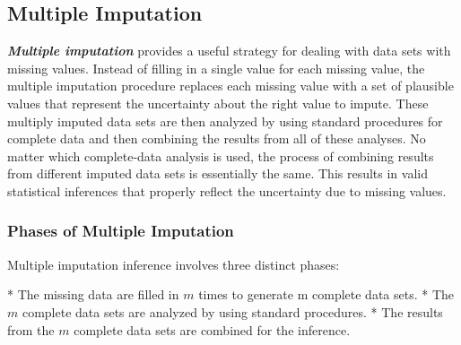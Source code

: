 \subsection{Multiple Imputation}
\textbf{\textit{Multiple imputation}} provides a useful strategy for dealing
with data sets with missing values. Instead of filling in a
single value for each missing value, the multiple
imputation procedure replaces each missing value with a
set of plausible values that represent the uncertainty about
the right value to impute. These multiply imputed data sets
are then analyzed by using standard procedures for complete
data and then combining the results from all of these analyses.
No matter which complete-data analysis is used, the process
of combining results from different imputed data sets
is essentially the same. This results in valid statistical inferences
that properly reflect the uncertainty due to missing
values.

\subsubsection{Phases of Multiple Imputation}
Multiple imputation inference involves three distinct phases:

*  The missing data are filled in $m$ times to generate m
complete data sets.
*  The $m$ complete data sets are analyzed by using
standard procedures.
*  The results from the $m$ complete data sets are combined
for the inference.


